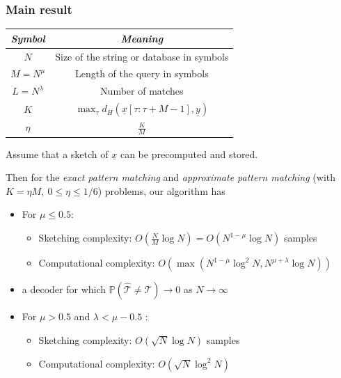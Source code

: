 \documentclass[10pt,xcolor=table]{beamer}
\newcommand{\mbb}{\mathbb}
\newcommand{\xv}{\underline{x}}
\newcommand{\yv}{\underline{y}}
\begin{document}
\begin{frame} \frametitle{Main result}
	
	{\small
		\begin{table}[h!]
			\begin{center}
				\begin{tabular}{|c|c|} 	
					\hline		
					\textit{Symbol}		&  \textit{Meaning} \\		
					\hline
					$N$           		& Size of the string or database in symbols \\
					\hline
					$M = N^{\mu}$       & Length of the query in symbols \\
					\hline
					$L = N^\lambda$    &   Number of matches \\
					\hline
					$K$             &$\max_{\tau}d_{H}(\xv[\tau:\tau+M-1],\yv)$\\
					\hline
					$\eta$             &$\frac{K}{M}$\\
					\hline
				\end{tabular}
			\end{center}
		\end{table}
	}	
	
	\vspace{-2.5mm}
	\begin{theorem}
		Assume that a sketch of $\xv$ can be precomputed and stored. 

Then for the {\it exact pattern matching} and {\it approximate pattern matching} (with $K = \eta M,~ 0 \leq \eta \leq 1/6$) problems, our algorithm has
		\begin{itemize}
		 \item	For $\mu \leq 0.5:$
		\begin{itemize}
			\item \alert{Sketching complexity:}
			{\color{blue} $O(\frac{N}{M}\log N)=O(N^{1-\mu}\log N)$} \alert{samples}
			\item \alert{Computational complexity:}
			{\color{blue}$O(\max(N^{1-\mu}\log^2 N, N^{\mu+\lambda}\log N ))$}
		\end{itemize}	
        \pause				 		
		\item a decoder for which $\mbb{P}(\hat{{\mathcal{T}}} \neq \mathcal{T}) \rightarrow 0$ as $N \rightarrow \infty$
        \pause
		\item	For $\mu > 0.5$ and $\lambda<\mu-0.5$ :
		\begin{itemize}
			\item \alert{Sketching complexity:}
			{\color{blue} $O(\sqrt{N}\log N)$} samples
			\item \alert{Computational complexity:}
			{\color{blue}$O(\sqrt{N}\log^2 N)$}
		\end{itemize}	

		\end{itemize}
	\end{theorem}
\end{frame}
\end{document}
